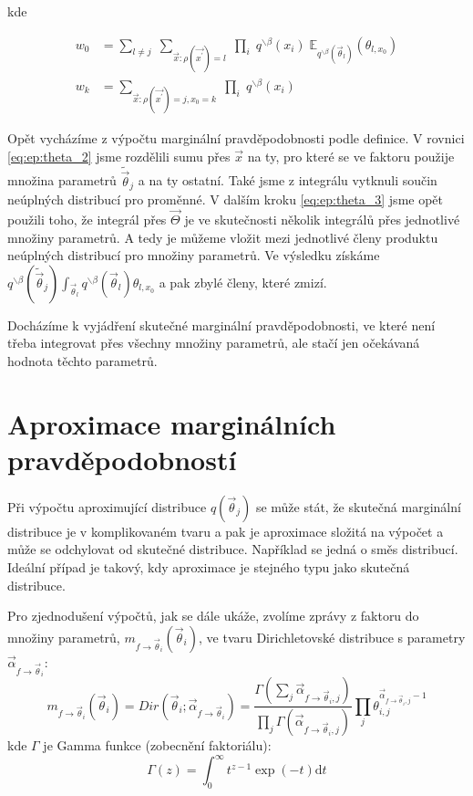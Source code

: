 kde

\begin{align}
w_0 &=
	\sum_{l \ne j} \;
		\sum_{\vec{x}: \rho(\vec{x^\prime}) = l} \;
			\prod_i \;
 				q^{\backslash \beta}(x_i) \;
				\mathbb{E}_{q^{\backslash \beta}(\vec{\theta}_l)} (
					\theta_{l,
					x_0}) 
\\
w_k &=
	\sum_{\vec{x}: \rho(\vec{x^\prime}) = j, x_0 = k} \; 
		\prod_i \;
			q^{\backslash \beta}(x_i)		
\end{align}

Opět vycházíme z výpočtu marginální pravděpodobnosti podle definice.
V rovnici \eqref{eq:ep:theta_2} jsme rozdělili sumu přes
$\vec{x}$ na ty, pro které se ve faktoru použije množina parametrů
$\tilde{\vec{\theta}}_j$ a na ty ostatní. Také jsme z integrálu vytknuli součin
neúplných distribucí pro proměnné. V dalším kroku \eqref{eq:ep:theta_3} jsme opět
použili toho, že integrál přes $\vec{\Theta}$ je ve skutečnosti několik
integrálů přes jednotlivé množiny parametrů. A tedy je můžeme vložit mezi
jednotlivé členy produktu neúplných distribucí pro množiny parametrů. Ve výsledku
získáme $q^{\backslash \beta}(\tilde{\vec{\theta}}_j) \int_{\vec{\theta}_l}
q^{\backslash \beta}(\vec{\theta}_l) \theta_{l, x_0}$ a pak zbylé členy, které zmizí.

Docházíme k vyjádření skutečné marginální pravděpodobnosti, ve které není třeba
integrovat přes všechny množiny parametrů, ale stačí jen očekávaná hodnota
těchto parametrů.

\section{Aproximace marginálních pravděpodobností}

Při výpočtu aproximující distribuce $q(\vec{\theta}_j)$ se může stát, že skutečná marginální distribuce je v komplikovaném tvaru a pak je aproximace složitá na výpočet a může se odchylovat od skutečné distribuce.
Například se jedná o směs distribucí.
Ideální případ je takový, kdy aproximace je stejného typu jako skutečná distribuce.

Pro zjednodušení výpočtů, jak se dále ukáže, zvolíme zprávy z faktoru do množiny parametrů, $m_{f \rightarrow \vec{\theta}_i}(\vec{\theta}_i)$, ve tvaru Dirichletovské distribuce s
parametry $\vec\alpha_{f \rightarrow \vec\theta_i}$:
\begin{equation}
m_{f \rightarrow \vec{\theta}_i}(\vec{\theta}_i) =
	Dir(\vec{\theta}_i; \vec\alpha_{f \rightarrow \vec\theta_i}) =
        \frac{\Gamma (\sum_j \vec\alpha_{f \rightarrow \vec\theta_i, j})}
             {\prod_j \Gamma(\vec\alpha_{f \rightarrow \vec\theta_i, j})}
        \prod_j \theta_{i,j}^{\vec\alpha_{f \rightarrow \vec\theta_i, j} - 1}
\end{equation}
kde $\Gamma$ je Gamma funkce (zobecnění faktoriálu):
\begin{equation}
    \Gamma(z) = \int_0^\infty \! t^{z-1} \exp(-t) \mathrm{d}t
\end{equation}

